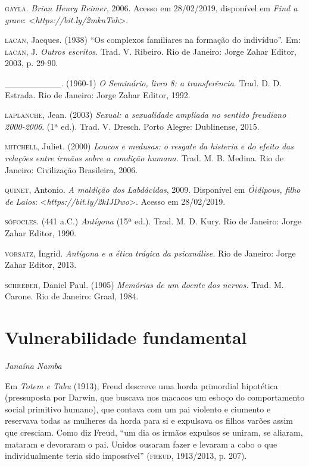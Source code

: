\begin{Parskip}
\textsc{gayla}. \emph{Brian Henry Reimer}, 2006. Acesso em 28/02/2019,
disponível em \emph{Find a grave}: \textless{}\emph{https://bit.ly/2mknTah}\textgreater{}.

\textsc{lacan}, Jacques. (1938) ``Os complexos familiares na formação do indivíduo''.
Em: \textsc{lacan}, J. \emph{Outros escritos}. Trad. V. Ribeiro. Rio
de Janeiro: Jorge Zahar Editor, 2003, p. 29-90.

\_\_\_\_\_\_\_\_\_. (1960-1) \emph{O Seminário, livro 8: a transferência}. Trad. D. D. Estrada. Rio de Janeiro: Jorge Zahar Editor, 1992.

\textsc{laplanche}, Jean. (2003) \emph{Sexual: a sexualidade ampliada no
sentido freudiano 2000-2006}. (1ª ed.). Trad. V. Dresch. Porto Alegre:
Dublinense, 2015.

\textsc{mitchell}, Juliet. (2000) \emph{Loucos e medusas: o resgate da histeria
e do efeito das relações entre irmãos sobre a condição humana.} Trad. M. B.
Medina. Rio de Janeiro: Civilização Brasileira, 2006. 

\textsc{quinet}, Antonio. \emph{A maldição dos Labdácidas}, 2009. Disponível em \emph{Óidipous, filho de Laios}: \textless{}\emph{https://bit.ly/2kIJDwo}\textgreater{}. Acesso em
28/02/2019.

\textsc{sófocles}. (441 a.C.) \emph{Antígona} (15ª ed.). Trad. M. D. Kury.
Rio de Janeiro: Jorge Zahar Editor, 1990.

\textsc{vorsatz}, Ingrid. \emph{Antígona e a ética trágica da psicanálise.}
Rio de Janeiro: Jorge Zahar Editor, 2013.

\textsc{schreber}, Daniel Paul. (1905) \emph{Memórias de um doente dos nervos.}
Trad. M. Carone. Rio de Janeiro: Graal, 1984.
\end{Parskip}


\chapter*{Vulnerabilidade fundamental}

\begin{flushright}
\emph{Janaína Namba}
\end{flushright}

Em \emph{Totem e Tabu} (1913), Freud descreve uma horda primordial
hipotética (pressuposta por Darwin, que buscava nos macacos um esboço do
comportamento social primitivo humano), que contava com um pai violento
e ciumento e reservava todas as mulheres da horda para si e expulsava os
filhos varões assim que cresciam. Como diz Freud, ``um dia os irmãos
expulsos se uniram, se aliaram, mataram e devoraram o pai. Unidos
ousaram fazer e levaram a cabo o que individualmente teria sido
impossível'' (\textsc{freud}, 1913/2013, p. 207).

